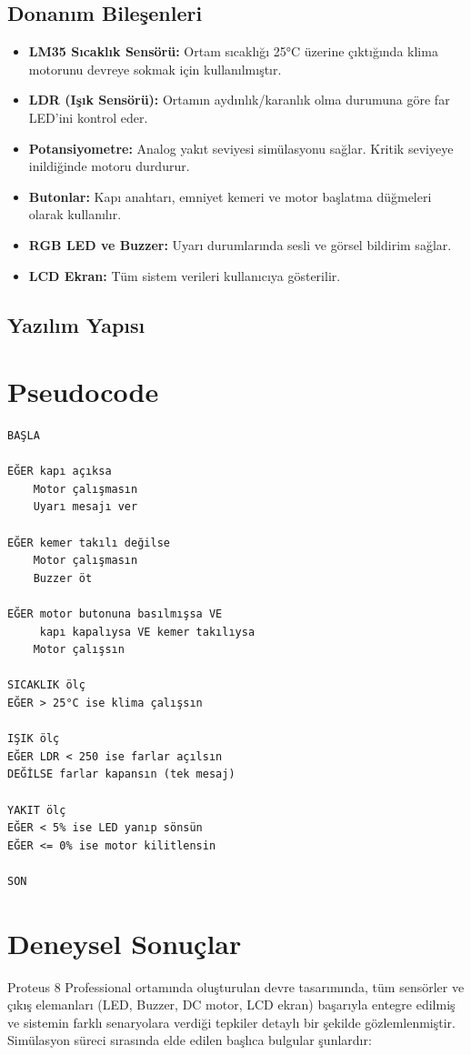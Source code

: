 \documentclass[conference]{IEEEtran}
\begin{document}
\subsection{Donanım Bileşenleri}
\begin{itemize}
    \item \textbf{LM35 Sıcaklık Sensörü:} Ortam sıcaklığı 25°C üzerine çıktığında klima motorunu devreye sokmak için kullanılmıştır.
    \item \textbf{LDR (Işık Sensörü):} Ortamın aydınlık/karanlık olma durumuna göre far LED’ini kontrol eder.
    \item \textbf{Potansiyometre:} Analog yakıt seviyesi simülasyonu sağlar. Kritik seviyeye inildiğinde motoru durdurur.
    \item \textbf{Butonlar:} Kapı anahtarı, emniyet kemeri ve motor başlatma düğmeleri olarak kullanılır.
    \item \textbf{RGB LED ve Buzzer:} Uyarı durumlarında sesli ve görsel bildirim sağlar.
    \item \textbf{LCD Ekran:} Tüm sistem verileri kullanıcıya gösterilir.
\end{itemize}

\subsection{Yazılım Yapısı}


\section{Pseudocode}

\begin{verbatim}
BAŞLA

EĞER kapı açıksa
    Motor çalışmasın
    Uyarı mesajı ver

EĞER kemer takılı değilse
    Motor çalışmasın
    Buzzer öt

EĞER motor butonuna basılmışsa VE
     kapı kapalıysa VE kemer takılıysa
    Motor çalışsın

SICAKLIK ölç
EĞER > 25°C ise klima çalışsın

IŞIK ölç
EĞER LDR < 250 ise farlar açılsın
DEĞİLSE farlar kapansın (tek mesaj)

YAKIT ölç
EĞER < 5% ise LED yanıp sönsün
EĞER <= 0% ise motor kilitlensin

SON
\end{verbatim}

\section{Deneysel Sonuçlar}
Proteus 8 Professional ortamında oluşturulan devre tasarımında, tüm sensörler ve çıkış elemanları (LED, Buzzer, DC motor, LCD ekran) başarıyla entegre edilmiş ve sistemin farklı senaryolara verdiği tepkiler detaylı bir şekilde gözlemlenmiştir. Simülasyon süreci sırasında elde edilen başlıca bulgular şunlardır:
\end{document}
